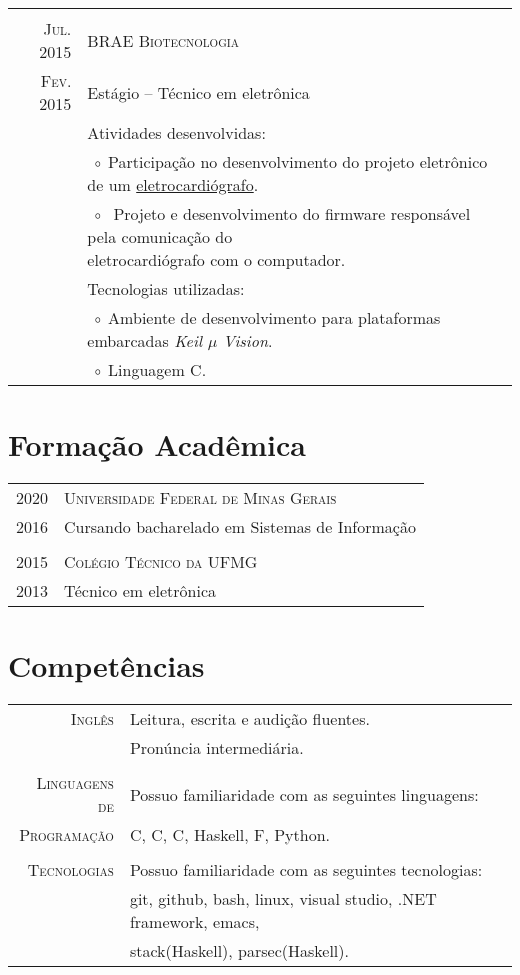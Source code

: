 \documentclass[a4paper,10pt]{article}
\newcommand{\tabitem}{$\;\circ\;$}
\newcommand{\cpp}{C\protect\scalebox{0.8}{\protect\raisebox{0.4ex}{++}}}
\renewcommand\#{\protect\scalebox{0.8}{\protect\raisebox{0.4ex}{\char"0023}}}
\begin{document}
\begin{tabular}{r|p{12.3cm}}
  \multicolumn{2}{c}{} \\
  \textsc{Jul. 2015} & \textsc{BRAE Biotecnologia} \\
  \textsc{Fev. 2015} & Estágio -- Técnico em eletrônica \\[5pt]
  & Atividades desenvolvidas: \\
  & \tabitem Participação no desenvolvimento do projeto eletrônico de um \href{http://www.ferox.vet.br/pt-br/produtos/ecg-veterinario.aspx}{eletrocardiógrafo}. \\
  & \tabitem \makecell[lt]{
              Projeto e desenvolvimento do firmware responsável pela comunicação do \\
              eletrocardiógrafo com o computador.
             } \\
  & Tecnologias utilizadas: \\
  & \tabitem Ambiente de desenvolvimento para plataformas embarcadas \textit{Keil $\mu$ \kern-5pt Vision}. \\
  & \tabitem Linguagem C.
\end{tabular}


\section{Formação Acadêmica}
\begin{tabular}{r|l}
  \textsc{2020} & \textsc{Universidade Federal de Minas Gerais} \\
  \textsc{2016} & Cursando bacharelado em Sistemas de Informação \\
  
  \multicolumn{2}{c}{} \\
  \textsc{2015} & \textsc{Colégio Técnico da UFMG} \\
  \textsc{2013} & Técnico em eletrônica \\
\end{tabular}


\section{Competências}
\begin{tabular}{r|l}
  \textsc{Inglês} & Leitura, escrita e audição fluentes. \\
  & Pronúncia intermediária. \\
  
  \multicolumn{2}{c}{} \\
  \textsc{Linguagens de} & Possuo familiaridade com as seguintes linguagens: \\
  \textsc{Programação}& C, \cpp, C\#, Haskell, F\#, Python. \\
  
  \multicolumn{2}{c}{} \\
  \textsc{Tecnologias} & Possuo familiaridade com as seguintes tecnologias: \\
  & git, github, bash, linux, visual studio, .NET framework, emacs, \\
  & stack(Haskell), parsec(Haskell).
\end{tabular}
\end{document}

